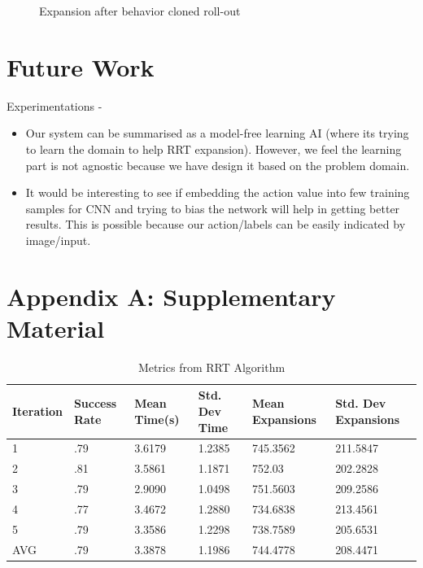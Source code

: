 \documentclass{article}
\begin{document}
\begin{figure}[h]
        \caption{Expansion after behavior cloned roll-out}
\end{figure}

\vspace{1cm}
\section{Future Work}
Experimentations - 
\begin{itemize}
  \item Our system can be summarised as a model-free learning AI (where its trying to learn the domain to help RRT expansion). However, we feel the learning part is not agnostic because we have design it based on the problem domain.
  \item It would be interesting to see if embedding the action value into few training samples for CNN and trying to bias the network will help in getting better results. This is possible because our action/labels can be easily indicated by image/input.
\end{itemize}





\vspace{1cm}
\section{Appendix A: Supplementary Material}

\begin{table}[h]
  \caption{Metrics from RRT Algorithm}
  \label{RRT Metrics}
  \centering
  \begin{tabular}{llllll}
    \cmidrule(r){1-6}
   Iteration & Success Rate & Mean Time(s) & Std. Dev Time & Mean Expansions & Std. Dev Expansions\\
    \midrule
    1 & .79 & 3.6179 & 1.2385 & 745.3562 & 211.5847 \\
    2 & .81 & 3.5861 & 1.1871 & 752.03 & 202.2828 \\
    3 & .79 & 2.9090 & 1.0498 & 751.5603 & 209.2586 \\
    4 & .77 & 3.4672 & 1.2880 & 734.6838 & 213.4561 \\
    5 & .79 & 3.3586 & 1.2298 & 738.7589 & 205.6531 \\
 \midrule
  AVG & .79 & 3.3878 & 1.1986 & 744.4778 & 208.4471 \\
    \bottomrule
  \end{tabular}
\end{table}
\end{document}
